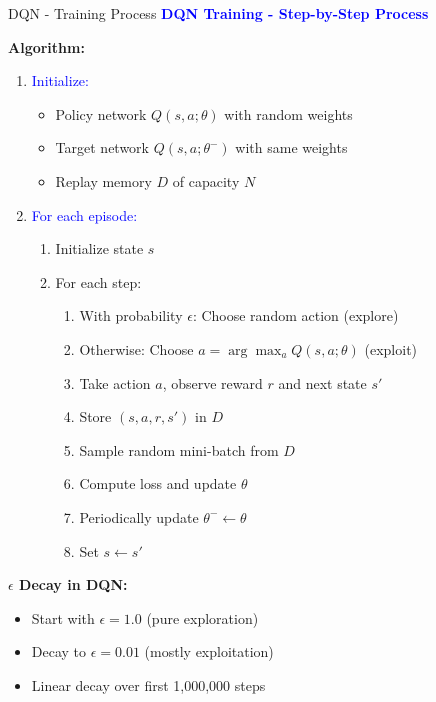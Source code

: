 \documentclass[8pt]{beamer}
\begin{document}
	\begin{frame}{DQN - Training Process}
		\fontsize{6.5}{7.5}\selectfont
		\textcolor{blue}{\textbf{DQN Training - Step-by-Step Process}}
		
		\textbf{Algorithm:}
		\begin{enumerate}
			\item \textcolor{blue}{Initialize:}
			\begin{itemize}
				\item Policy network $Q(s,a;\theta)$ with random weights
				\item Target network $Q(s,a;\theta^-)$ with same weights
				\item Replay memory $D$ of capacity $N$
			\end{itemize}
			
			\item \textcolor{blue}{For each episode:}
			\begin{enumerate}
				\item Initialize state $s$
				\item For each step:
				\begin{enumerate}
					\item With probability $\epsilon$: Choose random action (explore)
					\item Otherwise: Choose $a = \arg\max_a Q(s,a;\theta)$ (exploit)
					\item Take action $a$, observe reward $r$ and next state $s'$
					\item Store $(s,a,r,s')$ in $D$
					\item Sample random mini-batch from $D$
					\item Compute loss and update $\theta$
					\item Periodically update $\theta^- \leftarrow \theta$
					\item Set $s \leftarrow s'$
				\end{enumerate}
			\end{enumerate}
		\end{enumerate}
		
		\textbf{$\epsilon$ Decay in DQN:}
		\begin{itemize}
			\item Start with $\epsilon = 1.0$ (pure exploration)
			\item Decay to $\epsilon = 0.01$ (mostly exploitation)
			\item Linear decay over first 1,000,000 steps
		\end{itemize}
		

\end{frame}
\end{document}
